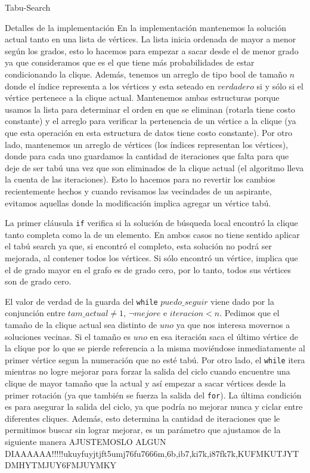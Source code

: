 \begin{section}{Tabu-Search}
\begin{subsection}{Detalles de la implementación}
		En la implementación mantenemos la solución actual tanto en una lista de vértices. La lista inicia ordenada de mayor a menor según los grados, esto lo hacemos para empezar a sacar desde el de menor grado ya que consideramos que es el que tiene más probabilidades de estar condicionando la clique. Además, tenemos un arreglo de tipo bool de tamaño $n$ donde el índice representa a los vértices y esta seteado en $verdadero$ si y sólo si el vértice pertenece a la clique actual. Mantenemos ambas estructuras porque usamos la lista para determinar el orden en que se eliminan (rotarla tiene costo constante) y el arreglo para verificar la pertenencia de un vértice a la clique (ya que esta operación en esta estructura de datos tiene costo constante).
		Por otro lado, mantenemos un arreglo de vértices (los índices representan los vértices), donde para cada uno guardamos la cantidad de iteraciones que falta para que deje de ser tabú una vez que son eliminados de la clique actual (el algoritmo lleva la cuenta de las iteraciones). Esto lo hacemos para no revertir los cambios recientemente hechos y cuando revisamos las vecindades de un aspirante, evitamos aquellas donde la modificación implica agregar un vértice tabú.

		La primer cláusula \texttt{if} verifica si la solución de búsqueda local encontró la clique tanto completa como la de un elemento. En ambos casos no tiene sentido aplicar el tabú search ya que, si encontró el completo, esta solución no podrá ser mejorada, al contener todos los vértices. Si sólo encontró un vértice, implica que el de grado mayor en el grafo es de grado cero, por lo tanto, todos sus vértices son de grado cero.

		El valor de verdad de la guarda del \texttt{while} $puedo\_seguir$ viene dado por la conjunción entre $tam\_actual \neq 1$, $\neg mejore$ e $iteracion<n$.
		Pedimos que el tamaño de la clique actual sea distinto de $uno$ ya que nos interesa movernos a soluciones vecinas. Si el tamaño es $uno$ en esa iteración saca el último vértice de la clique por lo que se pierde referencia a la misma moviéndose inmediatamente al primer vértice segun la numeración que no esté tabú.
		Por otro lado, el \texttt{while} itera mientras no logre mejorar para forzar la salida del ciclo cuando encuentre una clique de mayor tamaño que la actual y así empezar a sacar vértices desde la primer rotación (ya que también se fuerza la salida del \texttt{for}).
		La última condición es para asegurar la salida del ciclo, ya que podría no mejorar nunca y ciclar entre diferentes cliques. Además, esto determina la cantidad de iteraciones que le permitimos buscar sin lograr mejorar, es un parámetro que ajustamos de la siguiente manera AJUSTEMOSLO ALGUN DIAAAAAA!!!!!ukuyfuyjtjft5umj76fu7666m,6b,ib7,ki7k,i87fk7k,KUFMKUTJYTDMHYTMJUY6FMJUYMKY


\end{subsection}
\end{section}

